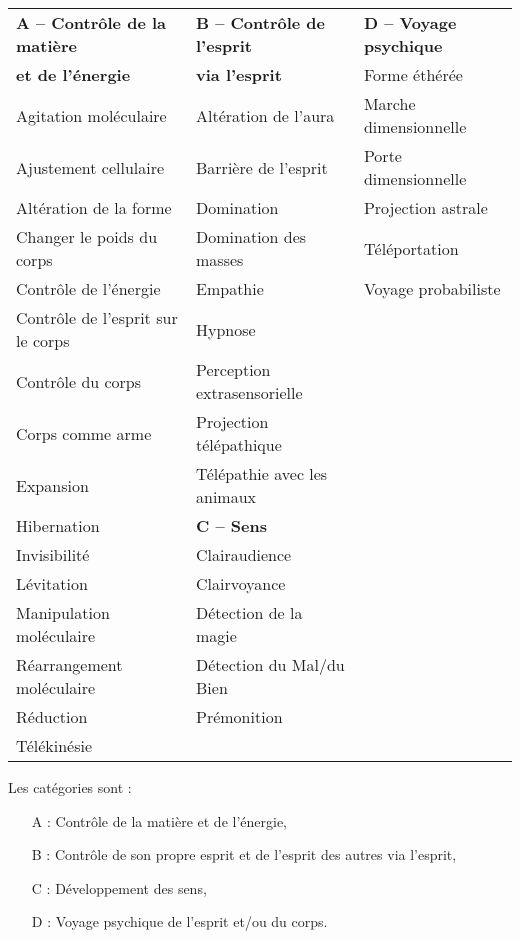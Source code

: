 \begin{tabular}{p{5.5cm}p{5.5cm}p{5.5cm}}
\textbf{A -- Contrôle de la matière} & \textbf{B -- Contrôle de l'esprit}   & \textbf{D -- Voyage psychique} \\
\textbf{et de l'énergie}             & \textbf{via l'esprit}                & Forme éthérée \\
Agitation moléculaire                & Altération de l'aura                 & Marche dimensionnelle \\
Ajustement cellulaire               & Barrière de l'esprit                 & Porte dimensionnelle \\
Altération de la forme              & Domination                           & Projection astrale \\
Changer le poids du corps           & Domination des masses                & Téléportation \\
Contrôle de l'énergie               & Empathie                             &  Voyage probabiliste\\
Contrôle de l'esprit sur le corps   & Hypnose & \\
Contrôle du corps                   & Perception extrasensorielle & \\
Corps comme arme                    & Projection télépathique &\\
Expansion                           & Télépathie avec les animaux &\\
Hibernation                         & \textbf{C -- Sens} & \\
Invisibilité                        & Clairaudience & \\
Lévitation                          & Clairvoyance & \\
Manipulation moléculaire            & Détection de la magie & \\
Réarrangement moléculaire           & Détection du Mal/du Bien & \\
Réduction                           & Prémonition & \\
Télékinésie                && \\
\end{tabular}

\bigskip

Les catégories sont :

\bigskip

\begin{itemize}
\item[A :] Contrôle de la matière et de l'énergie,
\item[B :] Contrôle de son propre esprit et de l'esprit des autres via l'esprit,
\item[C :] Développement des sens,
\item[D :] Voyage psychique de l'esprit et/ou du corps.
\end{itemize}

